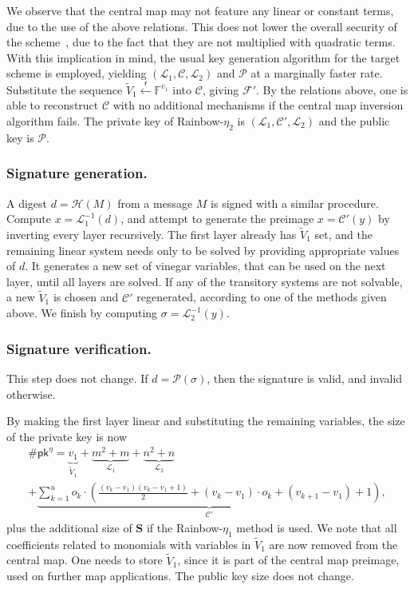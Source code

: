 \documentclass[draft, 12pt, a4paper, oneside]{memoir}
\newcommand{\random}{\overset{\mathsf{r}}{\gets}}
\theoremstyle{definition}
\begin{document}
We observe that the central map may not feature any linear or constant terms, due
to the use of the above relations. This does not lower the overall security of
the scheme~\cite[Section 3.1]{Ding:201901}, due to the fact that they are not multiplied with quadratic terms.
With this implication in mind, the usual key generation algorithm for the
target scheme is employed, yielding $(\mathcal{L}_{1}, \mathcal{C}, \mathcal{L}_{2})$
and $\mathcal{P}$ at a marginally faster rate. Substitute the sequence
$\widetilde{V}_{1} \random \mathbb{F}^{v_{1}}$ into $\mathcal{C}$, giving
$\mathcal{F'}$. By the relations above, one is able to reconstruct
$\mathcal{C}$ with no additional mechanisms if the central map inversion
algorithm fails. The private key of Rainbow-$\eta_{2}$ is
$(\mathcal{L}_{1}, \mathcal{C}', \mathcal{L}_{2})$ and the public key is $\mathcal{P}$.

\subsubsection{Signature generation.}

A digest $d = \mathcal{H}(M)$ from a message $M$ is signed with a similar
procedure. Compute $x = \mathcal{L}_{1}^{-1}(d)$, and attempt to generate the preimage
$x = \mathcal{C}'(y)$ by inverting every layer recursively. The first
layer already has $\widetilde{V}_{1}$ set, and the remaining linear system
needs only to be solved by providing appropriate values of $d$. It
generates a new set of vinegar variables, that can be used on the next layer,
until all layers are solved. If any of the transitory systems are not solvable,
a new $\widetilde{V}_{1}$ is chosen and $\mathcal{C}'$ regenerated, according
to one of the methods given above. We finish by computing
$\sigma = \mathcal{L}_{2}^{-1}(y)$.

\subsubsection{Signature verification.}

This step does not change. If $d = \mathcal{P}(\sigma)$, then the signature is
valid, and invalid otherwise.

By making the first layer linear and substituting the remaining variables, the
size of the private key is now
\begin{multline}
  \#\mathsf{pk}^{\eta} = \underbrace{v_{1}}_{\widetilde{V}_{1}}
    + \underbrace{m^{2} + m}_{\mathcal{L}_{1}}
    + \underbrace{n^{2} + n}_{\mathcal{L}_{2}} \\
    + \underbrace{\sum_{k = 1}^{u} o_{k} \cdot \left( \frac{(v_{k} - v_{1})(v_{k} - v_{1} + 1)}{2}
      + (v_{k} - v_{1}) \cdot o_{k} + (v_{k + 1} - v_{1}) + 1 \right)}_{\mathcal{C}'},
\end{multline}
plus the additional size of $\mathbf{S}$ if the Rainbow-$\eta_{1}$ method is
used. We note that all coefficients related to monomials with variables in $\widetilde{V}_{1}$ are now removed from the central map. One needs to store $\widetilde{V}_{1}$, since it is part of the central
map preimage, used on further map applications. The public key size does not
change.
\end{document}

